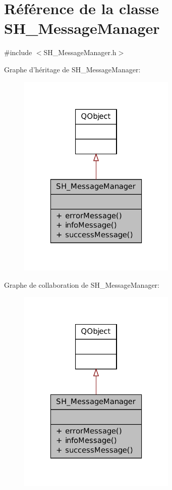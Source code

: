 \hypertarget{classSH__MessageManager}{\section{Référence de la classe S\-H\-\_\-\-Message\-Manager}
\label{classSH__MessageManager}
}


{\ttfamily \#include $<$S\-H\-\_\-\-Message\-Manager.\-h$>$}



Graphe d'héritage de S\-H\-\_\-\-Message\-Manager\-:
\nopagebreak
\begin{figure}[H]
\begin{center}
\leavevmode
\includegraphics[width=214pt]{classSH__MessageManager__inherit__graph}
\end{center}
\end{figure}


Graphe de collaboration de S\-H\-\_\-\-Message\-Manager\-:
\nopagebreak
\begin{figure}[H]
\begin{center}
\leavevmode
\includegraphics[width=214pt]{classSH__MessageManager__coll__graph}
\end{center}
\end{figure}
